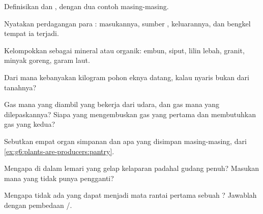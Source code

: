 \begin{exercise}[$\star$]\label{exo:g6:plants-are-producers:1}
Definisikan  dan , dengan dua contoh
masing-masing.
\end{exercise}

\begin{exercise}[$\star$]\label{exo:g6:plants-are-producers:2}
Nyatakan perdagangan para : masukannya, sumber ,
keluarannya, dan bengkel tempat ia terjadi.
\end{exercise}

\begin{exercise}[$\star$]\label{exo:g6:plants-are-producers:3}
Kelompokkan sebagai mineral atau organik: embun,  siput, lilin
lebah, granit, minyak goreng, garam laut.
\end{exercise}

\begin{exercise}[$\star$]\label{exo:g6:plants-are-producers:4}
Dari mana kebanyakan kilogram pohon eknya datang, kalau nyaris bukan
dari tanahnya?
\end{exercise}

\begin{exercise}[$\star$]\label{exo:g6:plants-are-producers:5}
Gas mana yang diambil  yang bekerja dari udara, dan gas mana yang
dilepaskannya? Siapa yang mengembuskan gas yang pertama dan
membutuhkan gas yang kedua?
\end{exercise}

\begin{exercise}[$\star$]\label{exo:g6:plants-are-producers:6}
Sebutkan empat organ simpanan  dan apa yang disimpan
masing-masing, dari \cref{ex:g6:plants-are-producers:pantry}.
\end{exercise}

\begin{exercise}[$\star\star$]\label{exo:g6:plants-are-producers:7}
Mengapa  di dalam lemari yang gelap kelaparan padahal gudang
 penuh? Masukan mana yang tidak punya pengganti?
\end{exercise}

\begin{exercise}[$\star\star$]\label{exo:g6:plants-are-producers:8}
Mengapa tidak ada  yang dapat menjadi mata rantai pertama sebuah
? Jawablah dengan pembedaan /.
\end{exercise}

